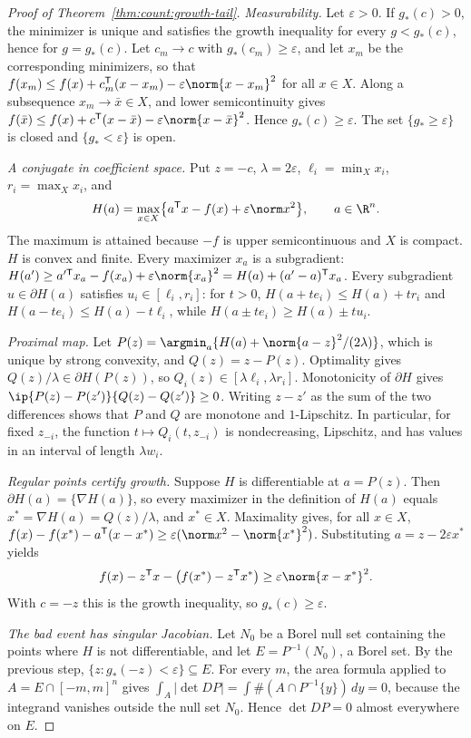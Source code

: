 \begin{proof}[Proof of Theorem~\ref{thm:count:growth-tail}]
\emph{Measurability.} Let $\varepsilon>0$. If $g_*(c)>0$, the minimizer is
unique and satisfies the growth inequality for every $g<g_*(c)$, hence for
$g=g_*(c)$. Let $c_m\to c$ with $g_*(c_m)\ge\varepsilon$, and let $x_m$ be the
corresponding minimizers, so that
$f(x_m)\le f(x)+c_m^{\mathsf T}(x-x_m)-\varepsilon\norm{x-x_m}^2$ for all $x\in X$.
Along a subsequence $x_m\to\bar x\in X$, and lower semicontinuity gives
$f(\bar x)\le f(x)+c^{\mathsf T}(x-\bar x)-\varepsilon\norm{x-\bar x}^2$. Hence
$g_*(c)\ge\varepsilon$. The set $\{g_*\ge\varepsilon\}$ is closed and
$\{g_*<\varepsilon\}$ is open.

\emph{A conjugate in coefficient space.} Put $z=-c$, $\lambda=2\varepsilon$,
$\ell_i=\min_Xx_i$, $r_i=\max_Xx_i$, and
\[
 H(a)=\max_{x\in X}\bigl\{a^{\mathsf T} x-f(x)+\varepsilon\norm x^2\bigr\},
 \qquad a\in\R^n .
\]
The maximum is attained because $-f$ is upper semicontinuous and $X$ is
compact. $H$ is convex and finite. Every maximizer $x_a$ is a subgradient:
$H(a')\ge a'^{\mathsf T} x_a-f(x_a)+\varepsilon\norm{x_a}^2=H(a)+(a'-a)^{\mathsf T} x_a$.
Every subgradient $u\in\partial H(a)$ satisfies $u_i\in[\ell_i,r_i]$: for
$t>0$, $H(a+te_i)\le H(a)+tr_i$ and $H(a-te_i)\le H(a)-t\ell_i$, while
$H(a\pm te_i)\ge H(a)\pm tu_i$.

\emph{Proximal map.} Let
$P(z)=\argmin_a\{H(a)+\norm{a-z}^2/(2\lambda)\}$, which is unique by strong
convexity, and $Q(z)=z-P(z)$. Optimality gives $Q(z)/\lambda\in\partial H(P(z))$,
so $Q_i(z)\in[\lambda\ell_i,\lambda r_i]$. Monotonicity of $\partial H$ gives
$\ip{P(z)-P(z')}{Q(z)-Q(z')}\ge0$. Writing $z-z'$ as the sum of the two
differences shows that $P$ and $Q$ are monotone and $1$-Lipschitz. In
particular, for fixed $z_{-i}$, the function $t\mapsto Q_i(t,z_{-i})$ is
nondecreasing, Lipschitz, and has values in an interval of length
$\lambda w_i$.

\emph{Regular points certify growth.} Suppose $H$ is differentiable at
$a=P(z)$. Then $\partial H(a)=\{\nabla H(a)\}$, so every maximizer in the
definition of $H(a)$ equals $x^*=\nabla H(a)=Q(z)/\lambda$, and $x^*\in X$.
Maximality gives, for all $x\in X$,
$f(x)-f(x^*)-a^{\mathsf T}(x-x^*)\ge\varepsilon(\norm x^2-\norm{x^*}^2)$. Substituting
$a=z-2\varepsilon x^*$ yields
\[
 f(x)-z^{\mathsf T} x-\bigl(f(x^*)-z^{\mathsf T} x^*\bigr)\ge\varepsilon\norm{x-x^*}^2 .
\]
With $c=-z$ this is the growth inequality, so $g_*(c)\ge\varepsilon$.

\emph{The bad event has singular Jacobian.} Let $N_0$ be a Borel null set
containing the points where $H$ is not differentiable, and let
$E=P^{-1}(N_0)$, a Borel set. By the previous step,
$\{z:g_*(-z)<\varepsilon\}\subseteq E$. For every $m$, the area formula
applied to $A=E\cap[-m,m]^n$ gives
$\int_A|\det DP|=\int\#(A\cap P^{-1}\{y\})\,dy=0$, because the integrand
vanishes outside the null set $N_0$. Hence $\det DP=0$ almost everywhere on
$E$.


\end{proof}
